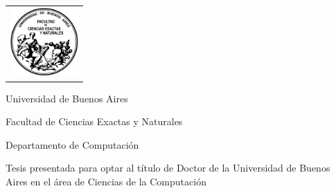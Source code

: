 \newcommand{\HRule}{\rule{\linewidth}{0.2mm}}
%
\thispagestyle{empty}

\begin{center}\leavevmode

\vspace{-2cm}

\begin{tabular}{l}
\includegraphics[width=2.6cm]{img/logofcen.png}
\end{tabular}


{\large \sc Universidad de Buenos Aires

Facultad de Ciencias Exactas y Naturales

Departamento de Computaci\'on}

\vspace{6.0cm}


\begin{huge}
\textbf{\tituloTesis}
\end{huge}

\vspace{2cm}

{\large Tesis presentada para optar al título de Doctor de la Universidad de Buenos Aires en
el área de Ciencias de la Computaci\'on}

\vspace{2cm}

{\Large \autor}

\end{center}

\vfill

